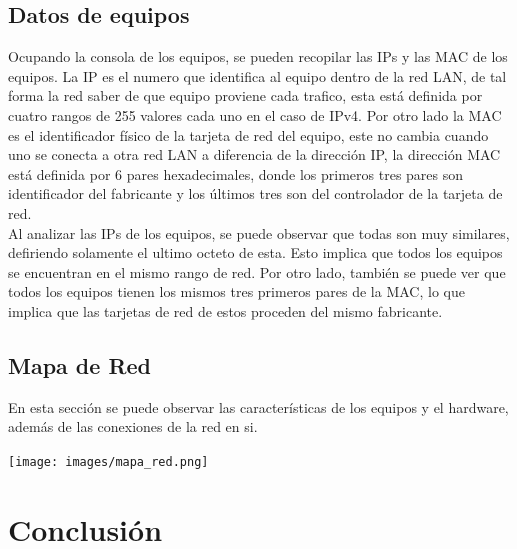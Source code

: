 \documentclass[spanish]{udpreport}
\begin{document}
\section{Datos de equipos}
Ocupando la consola de los equipos, se pueden recopilar las IPs y las MAC de los equipos. La IP es el numero que identifica al equipo dentro de la red LAN, de tal forma la red saber de que equipo proviene cada trafico, esta está definida por cuatro rangos de 255 valores cada uno en el caso de IPv4. Por otro lado la MAC es el identificador físico de la tarjeta de red del equipo, este no cambia cuando uno se conecta a otra red LAN a diferencia de la dirección IP, la dirección MAC está definida por 6 pares hexadecimales, donde los primeros tres pares son identificador del fabricante y los últimos tres son del controlador de la tarjeta de red.
\\

\setlength{\parindent}{0.5cm} Al analizar las IPs de los equipos, se puede observar que todas son muy similares, defiriendo solamente el ultimo octeto de esta. Esto implica que todos los equipos se encuentran en el mismo rango de red. Por otro lado, también se puede ver que todos los equipos tienen los mismos tres primeros pares de la MAC, lo que implica que las tarjetas de red de estos proceden del mismo fabricante.


\pagebreak
\section{Mapa de Red}
En esta sección se puede observar las características de los equipos y el hardware, además de las conexiones de la red en si. 
\begin{center}
	\texttt{[image: images/mapa\_red.png]} 
\end{center}

\listoffigures

\chapter{Conclusión}
\end{document}
